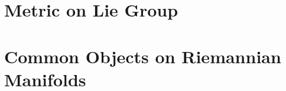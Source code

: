 \documentclass{article}
\begin{document}
\section{Metric on Lie Group}

\section{Common Objects on Riemannian Manifolds}
\end{document}
